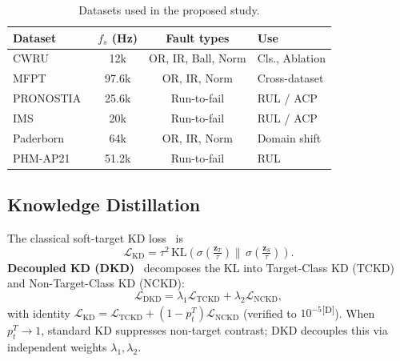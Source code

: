 \documentclass[conference]{IEEEtran}
\newcommand{\evD}{\textsuperscript{\textcolor{derived}{[D]}}\xspace}
\begin{document}
\begin{table}[t]
  \centering
  \caption{Datasets used in the proposed study.}
  \label{tab:datasets}
  \small
  \setlength{\tabcolsep}{4pt}
  \begin{tabular}{@{}lccl@{}}
    \toprule
    \textbf{Dataset} & $f_s$ (Hz) & \textbf{Fault types}
      & \textbf{Use}\\
    \midrule
    CWRU~\cite{cwru2000dataset}
      & 12k & OR, IR, Ball, Norm & Cls., Ablation\\
    MFPT~\cite{mfpt2013dataset}
      & 97.6k & OR, IR, Norm & Cross-dataset\\
    PRONOSTIA~\cite{nectoux2012pronostia}
      & 25.6k & Run-to-fail & RUL / ACP\\
    IMS~\cite{ims2003dataset}
      & 20k & Run-to-fail & RUL / ACP\\
    Paderborn~\cite{lessmeier2016condition}
      & 64k & OR, IR, Norm & Domain shift\\
    PHM-AP21~\cite{phmap2021challenge}
      & 51.2k & Run-to-fail & RUL\\
    \bottomrule
  \end{tabular}
\end{table}

\subsection{Knowledge Distillation}
\label{sec:kd}

The classical soft-target KD loss~\cite{hinton2015distilling} is
\begin{equation}
  \mathcal{L}_\mathrm{KD}
    = \tau^2\,\mathrm{KL}\!\left(
        \sigma\!\left(\tfrac{\bm{z}_T}{\tau}\right)
        \bigg\|\,
        \sigma\!\left(\tfrac{\bm{z}_S}{\tau}\right)\right).
  \label{eq:kd}
\end{equation}
\textbf{Decoupled KD (DKD)}~\cite{zhao2022decoupled} decomposes the KL
into Target-Class KD (TCKD) and Non-Target-Class KD (NCKD):
\begin{equation}
  \mathcal{L}_\mathrm{DKD}
    = \lambda_1\mathcal{L}_\mathrm{TCKD}
    + \lambda_2\mathcal{L}_\mathrm{NCKD},
  \label{eq:dkd}
\end{equation}
with identity
$\mathcal{L}_\mathrm{KD}
  = \mathcal{L}_\mathrm{TCKD}
  + (1{-}p_t^T)\mathcal{L}_\mathrm{NCKD}$
(verified to $10^{-5}$\evD).
When $p_t^T\!\to\!1$, standard KD suppresses non-target contrast;
DKD decouples this via independent weights $\lambda_1,\lambda_2$.
\end{document}
